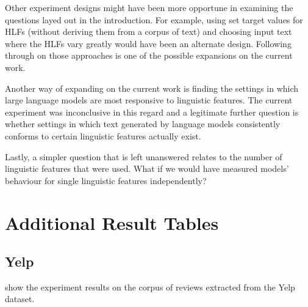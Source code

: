 \documentclass[11pt]{article}
\begin{document}
Other experiment designs might have been more opportune in examining the
questions layed out in the introduction.
For example, using set target values for HLFs (without deriving them from a
corpus of text) and choosing input text where the HLFs vary greatly would have
been an alternate design.
Following through on those approaches is one of the possible expansions on the
current work.

Another way of expanding on the current work is finding the settings in which
large language models are most responsive to linguistic features.
The current experiment was inconclusive in this regard and a legitimate further
question is whether settings in which text generated by language models
consistently conforms to certain linguistic features actually exist.

Lastly, a simpler question that is left unanswered relates to the number of
linguistic features that were used.
What if we would have measured models' behaviour for single linguistic features
independently?



\appendix

\section{Additional Result Tables}\label{sec:yelp-tables}
\subsection{Yelp}
 show the
experiment results on the corpus of reviews extracted from the Yelp dataset.
\end{document}

